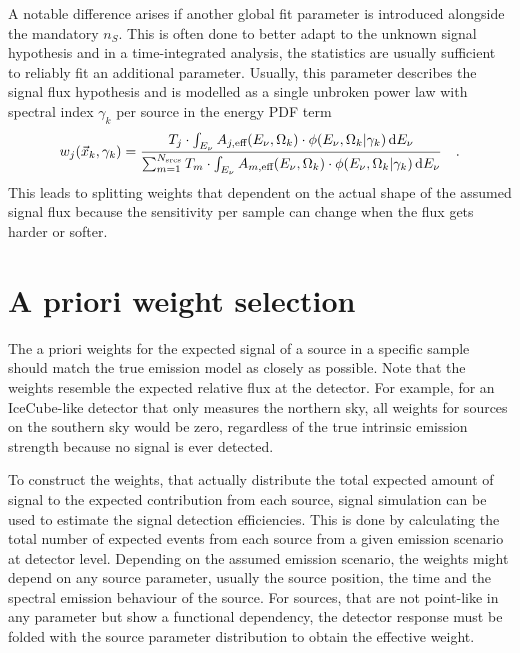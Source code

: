 A notable difference arises if another global fit parameter is introduced alongside the mandatory $n_S$.
This is often done to better adapt to the unknown signal hypothesis and in a time-integrated analysis, the statistics are usually sufficient to reliably fit an additional parameter.
Usually, this parameter describes the signal flux hypothesis and is modelled as a single unbroken power law with spectral index $\gamma_k$ per source in the energy PDF term
\begin{equation}
  w_j(\vec{x}_k, \gamma_k)
  = \frac
      {
        T_j \cdot \int_{E_\nu} A_{j,\text{eff}}(E_\nu,\Omega_k)\cdot
        \phi(E_\nu, \Omega_k | \gamma_k)\,\mathrm{d}E_\nu
      }
      {
        \sum_{m=1}^{N_\text{srcs}}
        T_m \cdot \int_{E_\nu} A_{m,\text{eff}}(E_\nu,\Omega_k)\cdot
        \phi(E_\nu, \Omega_k | \gamma_k)\,\mathrm{d}E_\nu
      }
  \quad\text{.}
\end{equation}
This leads to splitting weights that dependent on the actual shape of the assumed signal flux because the sensitivity per sample can change when the flux gets harder or softer.


\section{A priori weight selection}
The a priori weights for the expected signal of a source in a specific sample should match the true emission model as closely as possible.
Note that the weights resemble the expected relative flux at the detector.
For example, for an IceCube-like detector that only measures the northern sky, all weights for sources on the southern sky would be zero, regardless of the true intrinsic emission strength because no signal is ever detected.

To construct the weights, that actually distribute the total expected amount of signal to the expected contribution from each source, signal simulation can be used to estimate the signal detection efficiencies.
This is done by calculating the total number of expected events from each source from a given emission scenario at detector level.
Depending on the assumed emission scenario, the weights might depend on any source parameter, usually the source position, the time and the spectral emission behaviour of the source.
For sources, that are not point-like in any parameter but show a functional dependency, the detector response must be folded with the source parameter distribution to obtain the effective weight.

